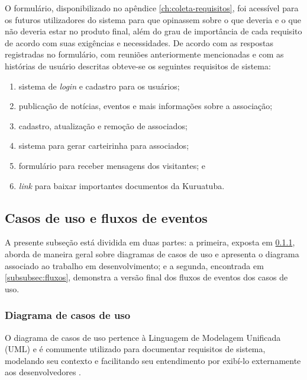 O formulário, disponibilizado no apêndice \ref{ch:coleta-requisitos}, foi acessível para os futuros utilizadores do sistema para que opinassem sobre o que deveria e o que não deveria estar no produto final, além do grau de importância de cada requisito de acordo com suas exigências e necessidades. De acordo com as respostas registradas no formulário, com reuniões anteriormente mencionadas e com as histórias de usuário descritas obteve-se os seguintes requisitos de sistema:

\begin{enumerate}
 \item sistema de \textit{login} e cadastro para os usuários;
 \item publicação de notícias, eventos e mais informações sobre a associação;
 \item cadastro, atualização e remoção de associados;
 \item sistema para gerar carteirinha para associados;
 \item formulário para receber mensagens dos visitantes; e
 \item \textit{link} para baixar importantes documentos da Kuruatuba.
\end{enumerate}


\hspace{2.5cm}
\subsection{Casos de uso e fluxos de eventos}
\label{subsec:usecase}
\hspace{2.5cm}

A presente subseção está dividida em duas partes: a primeira, exposta em \ref{subsubsec:casos-uso}, aborda de maneira geral sobre diagramas de casos de uso e apresenta o diagrama associado ao trabalho em desenvolvimento; e a segunda, encontrada em \ref{subsubsec:fluxos}, demonstra a versão final dos fluxos de eventos dos casos de uso.

\hspace{2.5cm}
\subsubsection{Diagrama de casos de uso}
\label{subsubsec:casos-uso}
\hspace{2.5cm}

O diagrama de casos de uso pertence à Linguagem de Modelagem Unificada (UML) e é comumente utilizado para documentar requisitos de sistema, modelando seu contexto e facilitando seu entendimento por exibí-lo externamente aos desenvolvedores \cite{de2001diagramas}.

